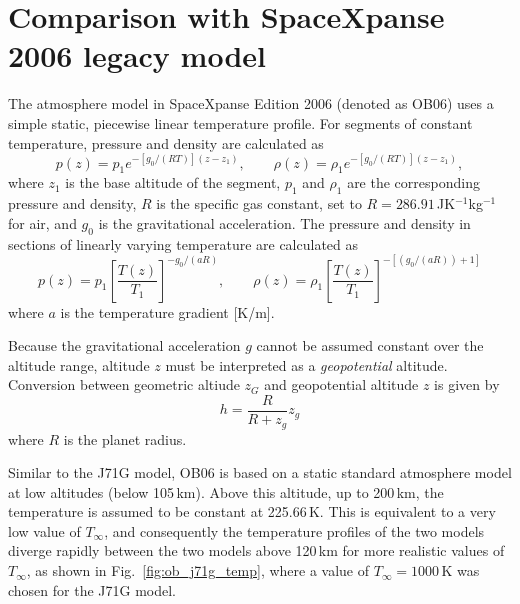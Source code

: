 \documentclass[a4paper]{article}
\begin{document}
\section{Comparison with SpaceXpanse 2006 legacy model}
The atmosphere model in SpaceXpanse Edition 2006 (denoted as OB06) uses a simple static, piecewise linear temperature profile. For segments of constant temperature, pressure and density are calculated as
\begin{equation}
p(z)=p_1 e^{-[g_0/(RT)](z-z_1)}, \qquad \rho(z)=\rho_1 e^{-[g_0/(RT)](z-z_1)},
\end{equation}
where $z_1$ is the base altitude of the segment, $p_1$ and $\rho_1$ are the corresponding pressure and density, $R$ is the specific gas constant, set to $R=286.91$\,JK$^{-1}$kg$^{-1}$ for air, and $g_0$ is the gravitational acceleration.
The pressure and density in sections of linearly varying temperature are calculated as
\begin{equation}
p(z)=p_1\left[\frac{T(z)}{T_1}\right]^{-g_0/(aR)},\qquad
\rho(z)=\rho_1\left[\frac{T(z)}{T_1}\right]^{-[(g_0/(aR))+1]}
\end{equation}
where $a$ is the temperature gradient [K/m].

Because the gravitational acceleration $g$ cannot be assumed constant over the altitude range, altitude $z$ must be interpreted as a \emph{geopotential} altitude. Conversion between geometric altiude $z_G$ and geopotential altitude $z$ is given by
\begin{equation}
h = \frac{R}{R+z_g}z_g
\end{equation}
where $R$ is the planet radius.

Similar to the J71G model, OB06 is based on a static standard atmosphere model at low altitudes (below 105\,km). Above this altitude, up to 200\,km, the temperature is assumed to be constant at 225.66\,K. This is equivalent to a very low value of $T_\infty$, and consequently the temperature profiles of the two models diverge rapidly between the two models above 120\,km for more realistic values of $T_\infty$, as shown in Fig.~\ref{fig:ob_j71g_temp}, where a value of $T_\infty=1000$\,K was chosen for the J71G model.
\end{document}
